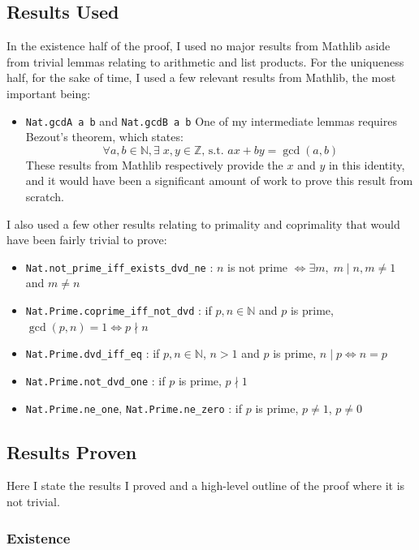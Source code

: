 \documentclass{article}
\begin{document}
\subsection{Results Used}
In the existence half of the proof, I used no major results from Mathlib
aside from trivial lemmas relating to arithmetic and list products. For the uniqueness half, for 
the sake of time, I used a few relevant results from Mathlib, the most important being:
\begin{itemize}
\item \verb|Nat.gcdA a b| and \verb|Nat.gcdB a b|
\newline One of my intermediate lemmas requires Bezout's theorem, which states: 
\[
\forall a, b \in \mathbb{N}, \exists\; x, y \in \mathbb{Z} \text{, s.t. } ax + by = \gcd(a, b) 
\]
These results from Mathlib respectively provide the $x$ and $y$ in this identity, and it would
have been a significant amount of work to prove this result from scratch.
\end{itemize}
I also used a few other results relating to primality and coprimality that would have been 
fairly trivial to prove:
\begin{itemize}
\item \verb|Nat.not_prime_iff_exists_dvd_ne| : $n$ is not prime $\iff \exists m, \; m \mid n, m \ne 1$ and $m \ne n$
\item \verb|Nat.Prime.coprime_iff_not_dvd| : if $p, n \in \mathbb{N}$ and $p$ is prime, 
$\gcd(p, n) = 1 \iff p \nmid n$ 
\item \verb|Nat.Prime.dvd_iff_eq| : if $p, n \in \mathbb{N}$, $n > 1$ and $p$ is prime, 
$n \mid p \iff n = p$
\item \verb|Nat.Prime.not_dvd_one| : if $p$ is prime, $p \nmid 1$
\item \verb|Nat.Prime.ne_one|, \verb|Nat.Prime.ne_zero| : if $p$ is prime, $p \ne 1$, $p \ne 0$

\end{itemize}

\newpage
\subsection{Results Proven}
Here I state the results I proved and a high-level outline of the proof where it 
is not trivial.
\subsubsection{Existence}
\end{document}
